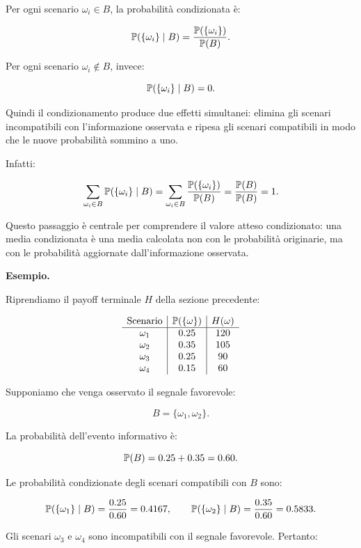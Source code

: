 Per ogni scenario $\omega_i\in B$, la probabilit\`{a} condizionata \`{e}:

\[
\mathbb{P}(\{\omega_i\}\mid B)
=
\frac{\mathbb{P}(\{\omega_i\})}{\mathbb{P}(B)}.
\]

Per ogni scenario $\omega_i\notin B$, invece:

\[
\mathbb{P}(\{\omega_i\}\mid B)=0.
\]

Quindi il condizionamento produce due effetti simultanei: elimina gli scenari incompatibili con l'informazione osservata e ripesa gli scenari compatibili in modo che le nuove probabilit\`{a} sommino a uno.

Infatti:

\[
\sum_{\omega_i\in B}\mathbb{P}(\{\omega_i\}\mid B)
=
\sum_{\omega_i\in B}
\frac{\mathbb{P}(\{\omega_i\})}{\mathbb{P}(B)}
=
\frac{\mathbb{P}(B)}{\mathbb{P}(B)}
=
1.
\]

Questo passaggio \`{e} centrale per comprendere il valore atteso condizionato: una media condizionata \`{e} una media calcolata non con le probabilit\`{a} originarie, ma con le probabilit\`{a} aggiornate dall'informazione osservata.

\medskip

\noindent
\textbf{Esempio.}

Riprendiamo il payoff terminale $H$ della sezione precedente:

\[
\begin{array}{c|c|c}
\text{Scenario} & \mathbb{P}(\{\omega\}) & H(\omega) \\
\hline
\omega_1 & 0.25 & 120 \\
\omega_2 & 0.35 & 105 \\
\omega_3 & 0.25 & 90 \\
\omega_4 & 0.15 & 60 \\
\end{array}
\]

Supponiamo che venga osservato il segnale favorevole:

\[
B=\{\omega_1,\omega_2\}.
\]

La probabilit\`{a} dell'evento informativo \`{e}:

\[
\mathbb{P}(B)=0.25+0.35=0.60.
\]

Le probabilit\`{a} condizionate degli scenari compatibili con $B$ sono:

\[
\mathbb{P}(\{\omega_1\}\mid B)
=
\frac{0.25}{0.60}
=
0.4167,
\qquad
\mathbb{P}(\{\omega_2\}\mid B)
=
\frac{0.35}{0.60}
=
0.5833.
\]

Gli scenari $\omega_3$ e $\omega_4$ sono incompatibili con il segnale favorevole. Pertanto:

